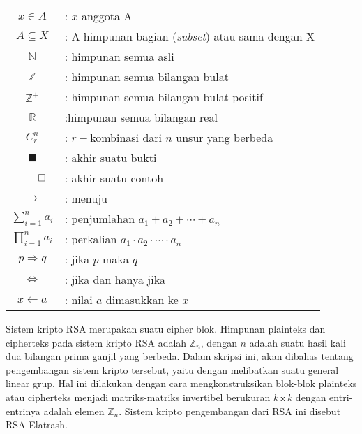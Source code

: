 \documentclass[skripsi]{unhasskripsi}
\theoremstyle{definition}
\begin{document}
\lambang
\begin{tabular}{cp{10cm}}
  $x\in A$ & : $x$ anggota A\\
  $A\subseteq X$ & : A himpunan bagian (\textit{subset}) atau sama dengan X\\
  $\mathbb{N}$ & : himpunan semua asli\\
  $\mathbb{Z}$ & : himpunan semua bilangan bulat\\
  $\mathbb{Z}^{+}$ & : himpunan semua bilangan bulat positif\\
  $\mathbb{R}$ & :himpunan semua bilangan real\\
  $C^{n}_{r}$ & : $r-$kombinasi dari $n$ unsur yang berbeda\\
  $\blacksquare$ & : akhir suatu bukti\\
  $\qed$\hfill & : akhir suatu contoh\\
  $\rightarrow$ & : menuju\\
  $\displaystyle\sum_{i=1}^{n}{a_{i}}$ & : penjumlahan $a_{1}+a_{2}+\cdots + a_{n}$\\
  $\displaystyle\prod_{i=1}^{n}{a_{i}}$ & : perkalian $a_{1}\cdot a_{2}\cdot\cdots \cdot a_{n}$\\
  $p \Rightarrow q$ & : jika $p$ maka $q$\\
  $\Leftrightarrow$ & : jika dan hanya jika\\
  $x\leftarrow a$ & : nilai $a$ dimasukkan ke $x$
\end{tabular}


\begin{abstractind}
Sistem kripto RSA merupakan suatu cipher blok. Himpunan plainteks dan cipherteks pada sistem kripto RSA adalah $\mathbb{Z}_{n}$, dengan $n$ adalah suatu hasil kali dua bilangan prima ganjil yang berbeda. Dalam skripsi ini, akan dibahas tentang pengembangan sistem kripto tersebut, yaitu dengan melibatkan suatu general linear grup. Hal ini dilakukan de\-ngan cara mengkonstruksikan blok-blok plainteks atau cipherteks menjadi matriks-matriks invertibel berukuran \mbox{$k \ \mathsf{x} \ k$} dengan entri-entrinya adalah elemen $\mathbb{Z}_{n}$. Sistem kripto pengembangan dari RSA ini disebut RSA Elatrash.
\end{abstractind}
\end{document}
